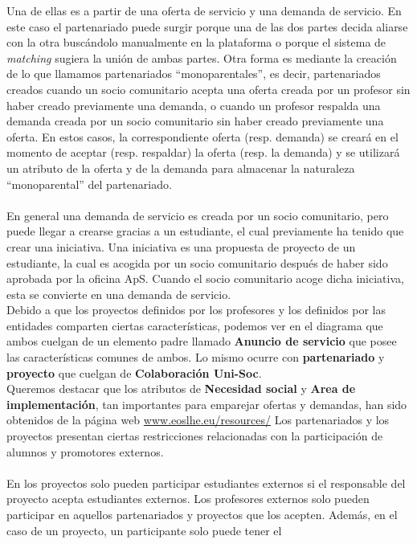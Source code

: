 \documentclass[11pt]{book}
\begin{document}
	Una de ellas es a partir de una oferta de servicio y una demanda de servicio. En este caso el partenariado puede surgir porque una de las dos partes decida aliarse con la otra buscándolo manualmente en la plataforma o porque el sistema de \textit{matching} sugiera la unión de ambas partes.
	Otra forma es mediante la creación de lo que llamamos partenariados ``monoparentales'', es decir, partenariados
	creados cuando un socio comunitario acepta una oferta creada por un
	profesor sin haber creado previamente una demanda, o cuando un profesor
	respalda una demanda creada por un socio comunitario sin haber creado
	previamente una oferta. En estos casos, la correspondiente oferta (resp.
	demanda) se creará en el momento de aceptar (resp. respaldar) la oferta
	(resp. la demanda) y se utilizará un atributo de la oferta y de la
	demanda para almacenar la naturaleza ``monoparental'' del partenariado.\\\\
	En general una demanda de servicio es creada por un socio comunitario, pero puede llegar a crearse gracias a un estudiante, el cual previamente ha tenido que crear una iniciativa. Una iniciativa es una propuesta de proyecto de un estudiante, la cual es acogida por un socio comunitario después de haber sido aprobada por la oficina ApS. Cuando el socio comunitario acoge dicha iniciativa, esta se convierte en una demanda de servicio.\\
	Debido a que los proyectos definidos por los profesores y los definidos por las entidades comparten ciertas características, podemos ver en el diagrama que ambos cuelgan de un elemento padre llamado \textbf{Anuncio de servicio} que posee las características comunes de ambos.
	Lo mismo ocurre con \textbf{partenariado} y \textbf{proyecto} que cuelgan de \textbf{Colaboración Uni-Soc}.\\
	Queremos destacar que los atributos de \textbf{Necesidad social} y \textbf{Area de implementación}, tan importantes para emparejar ofertas y demandas, han sido obtenidos de la página web \url{www.eoslhe.eu/resources/}
	Los partenariados y los proyectos presentan ciertas restricciones relacionadas con la participación de alumnos y promotores externos.\\\\
	En los proyectos solo pueden participar estudiantes externos si el responsable del proyecto acepta estudiantes externos. 
	Los profesores externos solo pueden participar en aquellos partenariados y proyectos que los acepten. Además, en el caso de un proyecto, un participante solo puede tener el
\end{document}
